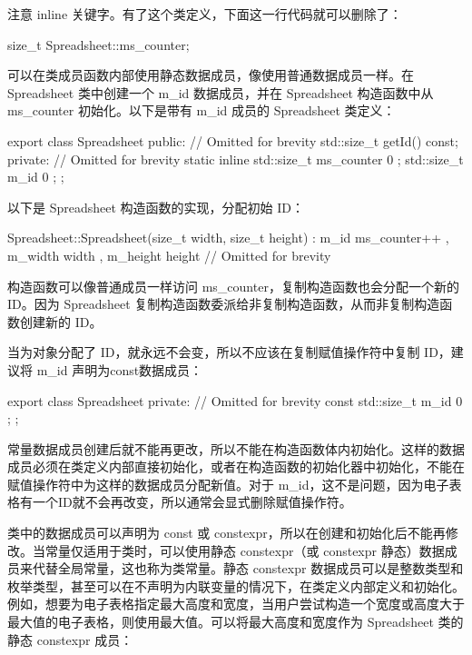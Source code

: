 注意 inline 关键字。有了这个类定义，下面这一行代码就可以删除了：

\begin{cpp}
size_t Spreadsheet::ms_counter;
\end{cpp}


可以在类成员函数内部使用静态数据成员，像使用普通数据成员一样。在 Spreadsheet 类中创建一个 m\_id 数据成员，并在 Spreadsheet 构造函数中从 ms\_counter 初始化。以下是带有 m\_id 成员的 Spreadsheet 类定义：

\begin{cpp}
export class Spreadsheet
{
    public:
        // Omitted for brevity
        std::size_t getId() const;
    private:
        // Omitted for brevity
        static inline std::size_t ms_counter { 0 };
        std::size_t m_id { 0 };
};
\end{cpp}

以下是 Spreadsheet 构造函数的实现，分配初始 ID：

\begin{cpp}
Spreadsheet::Spreadsheet(size_t width, size_t height)
    : m_id { ms_counter++ }, m_width { width }, m_height { height }
{
    // Omitted for brevity
}
\end{cpp}

构造函数可以像普通成员一样访问 ms\_counter，复制构造函数也会分配一个新的 ID。因为 Spreadsheet 复制构造函数委派给非复制构造函数，从而非复制构造函数创建新的 ID。

当为对象分配了 ID，就永远不会变，所以不应该在复制赋值操作符中复制 ID，建议将 m\_id 声明为const数据成员：

\begin{cpp}
export class Spreadsheet
{
    private:
        // Omitted for brevity
        const std::size_t m_id { 0 };
};
\end{cpp}

常量数据成员创建后就不能再更改，所以不能在构造函数体内初始化。这样的数据成员必须在类定义内部直接初始化，或者在构造函数的初始化器中初始化，不能在赋值操作符中为这样的数据成员分配新值。对于 m\_id，这不是问题，因为电子表格有一个ID就不会再改变，所以通常会显式删除赋值操作符。


类中的数据成员可以声明为 const 或 constexpr，所以在创建和初始化后不能再修改。当常量仅适用于类时，可以使用静态 constexpr（或 constexpr 静态）数据成员来代替全局常量，这也称为类常量。静态 constexpr 数据成员可以是整数类型和枚举类型，甚至可以在不声明为内联变量的情况下，在类定义内部定义和初始化。例如，想要为电子表格指定最大高度和宽度，当用户尝试构造一个宽度或高度大于最大值的电子表格，则使用最大值。可以将最大高度和宽度作为 Spreadsheet 类的静态 constexpr 成员：

